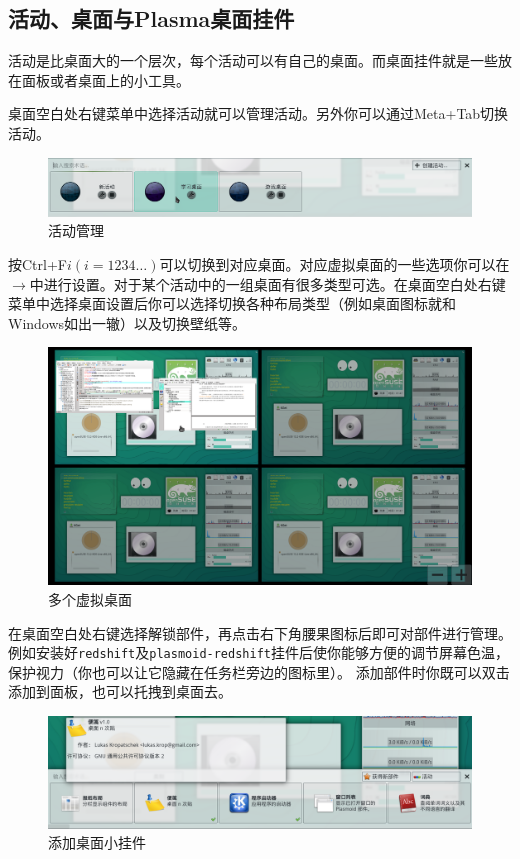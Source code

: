 \documentclass[11pt,openany]{book}
\newcommand{\soft}[1]{\texttt{\textcolor{dgreen}{#1}}}
\newcommand{\menu}[1]{\fbox{#1}}
\newcommand{\me}{$\rightarrow$}
\begin{document}
\subsection{活动、桌面与Plasma桌面挂件}
活动是比桌面大的一个层次，每个活动可以有自己的桌面。而桌面挂件就是一些放在面板或者桌面上的小工具。

桌面空白处右键菜单中选择活动就可以管理活动。另外你可以通过Meta+Tab切换活动。
\begin{figure}[htb]
\centering
\includegraphics[width=\textwidth]{./pic/activity.png} 
\caption{活动管理}\label{activity}
\end{figure}

按Ctrl+F$i(i=1234\ldots)$可以切换到对应桌面。对应虚拟桌面的一些选项你可以在\menu{工作空间行为}\me\menu{虚拟桌面}中进行设置。对于某个活动中的一组桌面有很多类型可选。在桌面空白处右键菜单中选择桌面设置后你可以选择切换各种布局类型（例如桌面图标就和Windows如出一辙）以及切换壁纸等。
\begin{figure}[htb]
\centering
\includegraphics[width=\textwidth]{./pic/virtualdesk.png} 
\caption{多个虚拟桌面}\label{multidesk}
\end{figure}
在桌面空白处右键选择解锁部件，再点击右下角腰果图标后即可对部件进行管理。例如安装好\soft{redshift}及\soft{plasmoid-redshift}挂件后使你能够方便的调节屏幕色温，保护视力（你也可以让它隐藏在任务栏旁边的图标里）。
添加部件时你既可以双击添加到面板，也可以托拽到桌面去。
\begin{figure}[htb]
\centering
\includegraphics[width=\textwidth]{./pic/plasma.png} 
\caption{添加桌面小挂件}\label{plasma}
\end{figure}
\end{document}
